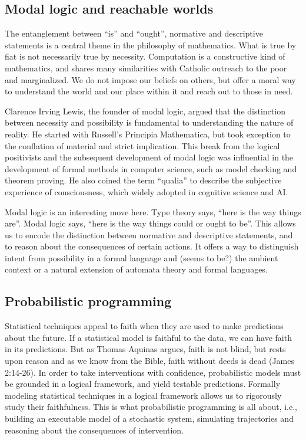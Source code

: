 \documentclass[sigplan,nonacm]{acmart}\settopmatter{printfolios=false,printccs=false,printacmref=false}
\begin{document}
  \subsection{Modal logic and reachable worlds}

  The entanglement between ``is'' and ``ought'', normative and descriptive statements is a central theme in the philosophy of mathematics. What is true by fiat is not necessarily true by necessity. Computation is a constructive kind of mathematics, and shares many similarities with Catholic outreach to the poor and marginalized. We do not impose our beliefs on others, but offer a moral way to understand the world and our place within it and reach out to those in need.

  Clarence Irving Lewis, the founder of modal logic, argued that the distinction between necessity and possibility is fundamental to understanding the nature of reality. He started with Russell's Principia Mathematica, but took exception to the conflation of material and strict implication. This break from the logical positivists and the subsequent development of modal logic was influential in the development of formal methods in computer science, such as model checking and theorem proving. He also coined the term ``qualia'' to describe the subjective experience of consciousness, which widely adopted in cognitive science and AI.

  Modal logic is an interesting move here. Type theory says, ``here is the way things are''. Modal logic says, ``here is the way things could or ought to be''. This allows us to encode the distinction between normative and descriptive statements, and to reason about the consequences of certain actions. It offers a way to distinguish intent from possibility in a formal language and (seems to be?) the ambient context or a natural extension of automata theory and formal languages.

  \subsection{Probabilistic programming}

  Statistical techniques appeal to faith when they are used to make predictions about the future. If a statistical model is faithful to the data, we can have faith in its predictions. But as Thomas Aquinas argues, faith is not blind, but rests upon reason and as we know from the Bible, faith without deeds is dead (James 2:14-26). In order to take interventions with confidence, probabilistic models must be grounded in a logical framework, and yield testable predictions. Formally modeling statistical techniques in a logical framework allows us to rigorously study their faithfulness. This is what probabilistic programming is all about, i.e., building an executable model of a stochastic system, simulating trajectories and reasoning about the consequences of intervention.
\end{document}
